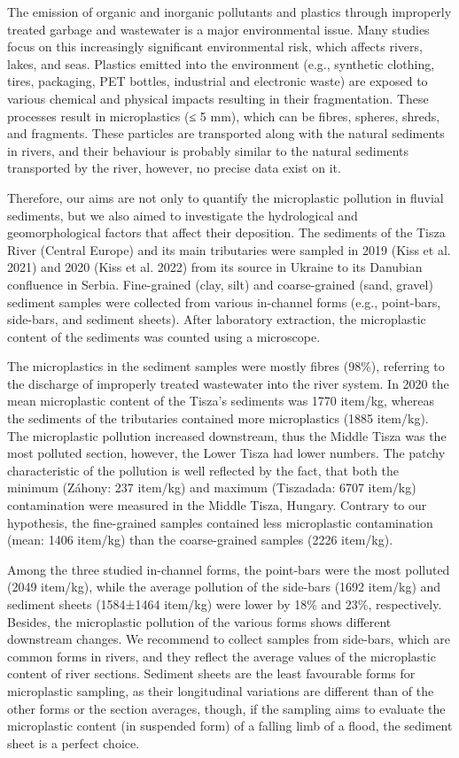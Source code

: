 {The emission of organic and inorganic pollutants and plastics through improperly treated garbage and wastewater is a major environmental issue. Many studies focus on this increasingly significant environmental risk, which affects rivers, lakes, and seas. Plastics emitted into the environment (e.g., synthetic clothing, tires, packaging, PET bottles, industrial and electronic waste) are exposed to various chemical and physical impacts resulting in their fragmentation. These processes result in microplastics (≤ 5 mm), which can be fibres, spheres, shreds, and fragments. These particles are transported along with the natural sediments in rivers, and their behaviour is probably similar to the natural sediments transported by the river, however, no precise data exist on it. 

Therefore, our aims are not only to quantify the microplastic pollution in fluvial sediments, but we also aimed to investigate the hydrological and geomorphological factors that affect their deposition. The sediments of the Tisza River (Central Europe) and its main tributaries were sampled in 2019 (Kiss et al. 2021) and 2020 (Kiss et al. 2022) from its source in Ukraine to its Danubian confluence in Serbia. Fine-grained (clay, silt) and coarse-grained (sand, gravel) sediment samples were collected from various in-channel forms (e.g., point-bars, side-bars, and sediment sheets). After laboratory extraction, the microplastic content of the sediments was counted using a microscope.

The microplastics in the sediment samples were mostly fibres (98\%), referring to the discharge of improperly treated wastewater into the river system. In 2020 the mean microplastic content of the Tisza’s sediments was 1770 item/kg, whereas the sediments of the tributaries contained more microplastics (1885 item/kg). The microplastic pollution increased downstream, thus the Middle Tisza was the most polluted section, however, the Lower Tisza had lower numbers. The patchy characteristic of the pollution is well reflected by the fact, that both the minimum (Záhony: 237 item/kg) and maximum (Tiszadada: 6707 item/kg) contamination were measured in the Middle Tisza, Hungary.
Contrary to our hypothesis, the fine-grained samples contained less microplastic contamination (mean: 1406 item/kg) than the coarse-grained samples (2226 item/kg). 

Among the three studied in-channel forms, the point-bars were the most polluted (2049 item/kg), while the average pollution of the side-bars (1692 item/kg) and sediment sheets (1584±1464 item/kg) were lower by 18\% and 23\%, respectively. Besides, the microplastic pollution of the various forms shows different downstream changes. We recommend to collect samples from side-bars, which are common forms in rivers, and they reflect the average values of the microplastic content of river sections. Sediment sheets are the least favourable forms for microplastic sampling, as their longitudinal variations are different than of the other forms or the section averages, though, if the sampling aims to evaluate the microplastic content (in suspended form) of a falling limb of a flood, the sediment sheet is a perfect choice.

}
